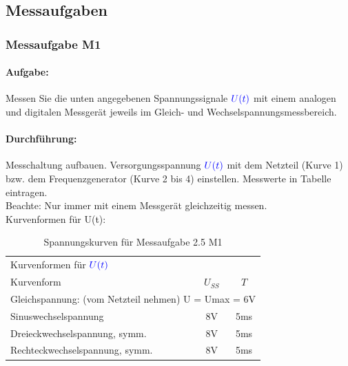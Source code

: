 \documentclass[11pt,a4paper,titlepage,parskip=half]{scrreprt}
\begin{document}
            \subsection{Messaufgaben}
            \subsubsection{Messaufgabe M1}
            \paragraph{Aufgabe:} Messen Sie die unten angegebenen Spannungssignale $\textcolor{blue}{U(t)}$ mit einem analogen und digitalen Messgerät jeweils im Gleich- und Wechselspannungsmessbereich.
            \paragraph{Durchführung:} Messchaltung aufbauen. Versorgungsspannung $\textcolor{blue}{U(t)}$ mit dem Netzteil (Kurve 1) bzw. dem Frequenzgenerator (Kurve 2 bis 4) einstellen. Messwerte in Tabelle eintragen.\\
            Beachte: Nur immer mit  einem   Messgerät gleichzeitig messen.\\
            			
			Kurvenformen für U(t):            
            \begin{center}
                \begin{table}[H]
                    \caption{Spannungskurven für Messaufgabe 2.5 M1}
                    \label{tbl:kurven2.1}
                    \renewcommand{\arraystretch}{1.3}
                    \begin{center}
                        \begin{tabular}{l|cc}
                            \multicolumn{3}{l}{Kurvenformen für $\textcolor{blue}{U(t)}$}\\
                            Kurvenform & $U_{SS}$ & $T$\\ \hline
                            \multicolumn{3}{l}{Gleichspannung: (vom Netzteil nehmen)      U =  Umax = 6V}   \\
                            Sinuswechselspannung & 8V & 5ms   \\
                            Dreieckwechselspannung, symm.& 8V & 5ms\\   
                            Rechteckwechselspannung, symm.& 8V &5ms \\
                        \end{tabular}
                    \end{center}
                \end{table}
            \end{center}            
             
\end{document}
